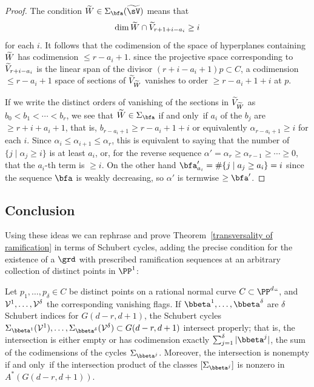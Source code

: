 \begin{proof}

The condition $\tL \in \Sigma_{\bfa}({\tsV})$
 means that
$$
\dim \tL \cap \tV_{r+1+i-a_i} \geq i
$$
for each $i$.
It follows that the codimension of the space of hyperplanes containing
$\tL$ has codimension $\leq r-a_i+1$.
since the projective space corresponding to $\tV_{r+i-a_i}$ is the linear
span of the divisor $(r+i-a_i+1)p\subset C$,
a codimension $\leq r-a_i+1$ space of sections of $\tV_{\tL}$  vanishes
to order $\geq r -a_i+1+i$ at $p$.

If we write the distinct orders of vanishing of the sections in
$\tV_{\tL}$ as
$b_0 < b_1<  \cdots < b_r$, we see that $\tL \in \Sigma_{\bfa}$  if
and only~if
$a_i$ of the $b_j$ are $\geq r+i+a_i+1$, that is,
$b_{r-a_i+1}\geq r-a_i+1+i$ or equivalently $\alpha_{r-a_i+1}\geq i$
for each $i$.
Since $\alpha_i\leq \alpha_{i+1} \leq \alpha_r$,
this is equivalent to saying that the number of $\{j \mid \alpha_j \geq
i\}$ is at least $a_i$, or, for the
reverse sequence $\alpha' = \alpha_r \geq \alpha_{r-1} \geq \cdots \geq
0$, that the $a_i$-th term is $\geq i$.
On the other hand $\bfa'_{a_i} = \#\{j\mid a_j \geq a_i\} = i$ since
the sequence $\bfa$ is weakly
decreasing, so $\alpha'$ is termwise $\geq \bfa'$.
\end{proof}

\subsection*{Conclusion}

Using these ideas we  can rephrase and prove Theorem~\ref{transversality
of ramification} in terms of Schubert cycles,
adding the precise condition for the existence of a $\grd$ with prescribed
ramification sequences
at an arbitrary collection of distinct points in $\PP^{1}$:

\begin{theorem}\label{osculating intersection}
Let $p_1,\dots,p_\delta \in C$ be distinct points on a rational normal
curve $C \subset \PP^d` `$, and ${\cal V}^1, \dots, {\cal V}^\delta$ the
corresponding vanishing flags. If ${\bbeta}^1, \dots, {\bbeta}^\delta$
are $\delta$ Schubert indices for $G(d-r, d+1)$, the Schubert cycles
$\Sigma_{{\bbeta}^1}({\cal V}^1), \dots, \Sigma_{{\bbeta}^\delta}({\cal
V}^\delta) \subset G(d-r, d+1)$ intersect properly; that is, the
intersection is either empty or has codimension exactly $\sum_{j
=1}^{\delta}|\bbeta^{j}|$,
the sum of the codimensions of the cycles $\Sigma_{{\bbeta}^j}$. Moreover,
the intersection is nonempty if and only~if
 the intersection product of the classes $[\Sigma_{{\bbeta}^j}]$ is
 nonzero in $A^*(G(d-r, d+1))$.
\end{theorem}


